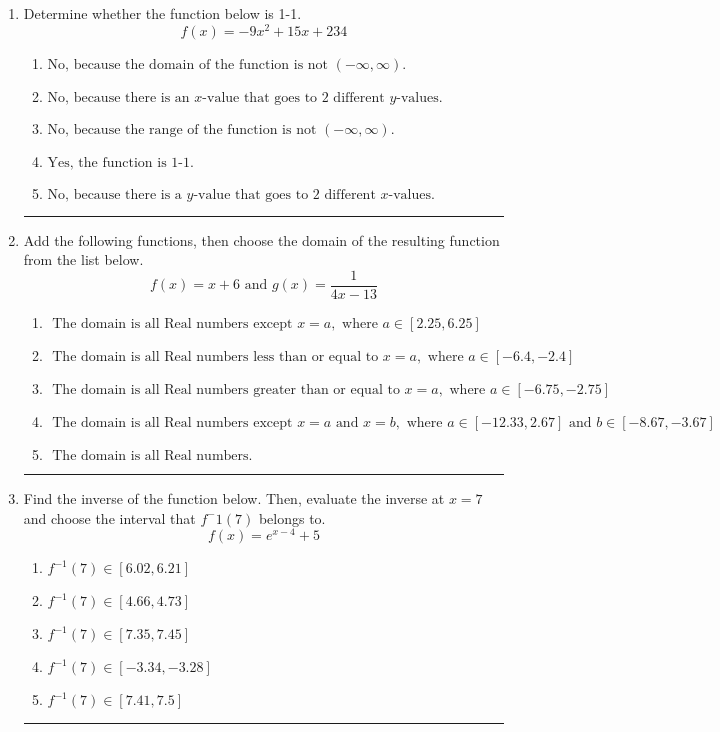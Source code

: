 \documentclass[14pt]{extbook}
\newcommand{\litem}[1]{\item#1\hspace*{-1cm}\rule{\textwidth}{0.4pt}}
\begin{document}
\begin{enumerate}
{\begin{enumerate}[label=\Alph*.]
\end{enumerate} }
\litem{
Determine whether the function below is 1-1.\[ f(x) = -9 x^2 + 15 x + 234 \]\begin{enumerate}[label=\Alph*.]
\item \( \text{No, because the domain of the function is not $(-\infty, \infty)$.} \)
\item \( \text{No, because there is an $x$-value that goes to 2 different $y$-values.} \)
\item \( \text{No, because the range of the function is not $(-\infty, \infty)$.} \)
\item \( \text{Yes, the function is 1-1.} \)
\item \( \text{No, because there is a $y$-value that goes to 2 different $x$-values.} \)

\end{enumerate} }
\litem{
Add the following functions, then choose the domain of the resulting function from the list below.\[ f(x) = x + 6 \text{ and } g(x) = \frac{1}{4x-13} \]\begin{enumerate}[label=\Alph*.]
\item \( \text{ The domain is all Real numbers except } x = a, \text{ where } a \in [2.25, 6.25] \)
\item \( \text{ The domain is all Real numbers less than or equal to } x = a, \text{ where } a \in [-6.4, -2.4] \)
\item \( \text{ The domain is all Real numbers greater than or equal to } x = a, \text{ where } a \in [-6.75, -2.75] \)
\item \( \text{ The domain is all Real numbers except } x = a \text{ and } x = b, \text{ where } a \in [-12.33, 2.67] \text{ and } b \in [-8.67, -3.67] \)
\item \( \text{ The domain is all Real numbers. } \)

\end{enumerate} }
\litem{
Find the inverse of the function below. Then, evaluate the inverse at $x = 7$ and choose the interval that $f^-1(7)$ belongs to.\[ f(x) = e^{x-4}+5 \]\begin{enumerate}[label=\Alph*.]
\item \( f^{-1}(7) \in [6.02, 6.21] \)
\item \( f^{-1}(7) \in [4.66, 4.73] \)
\item \( f^{-1}(7) \in [7.35, 7.45] \)
\item \( f^{-1}(7) \in [-3.34, -3.28] \)
\item \( f^{-1}(7) \in [7.41, 7.5] \)


\end{enumerate}}
\end{enumerate}
\end{document}

